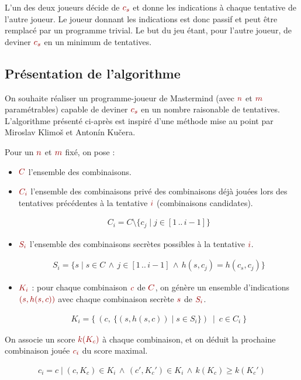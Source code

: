 \documentclass[a4paper]{article}
\newcommand{\isep}{\,..\,}
\renewcommand{\(}{\begin{math}\color{brick}}
\renewcommand{\)}{\end{math}}
\newcommand{\blockmath}[1]{{\color{brick}\begin{align*}#1\end{align*}}}
\newcommand{\nblockmath}[1]{{\color{brick}\begin{align}#1\end{align}}}
\newcommand{\lnd}{\,\land\,}
\begin{document}
L'un des deux joueurs décide de \(c_s\) et donne les indications à
chaque tentative de l'autre joueur. Le joueur donnant les indications est
donc passif et peut être remplacé par un programme trivial. Le but du
jeu étant, pour l'autre joueur, de deviner \(c_s\) en un minimum de
tentatives.

\subsection{Présentation de l'algorithme}

On souhaite réaliser un programme-joueur de Mastermind (avec \(n\) et \(m\) paramétrables) capable de deviner \(c_s\) en un nombre raisonable de tentatives. L'algorithme présenté ci-après est inspiré d'une méthode\cite{sat} mise au point par Miroslav Klimoš et Antonín Kučera.

Pour un \(n\) et \(m\) fixé, on pose :

\begin{itemize}
  
\item \(C\) l'ensemble des combinaisons.
  
\item \(C_i\) l'ensemble des combinaisons privé des combinaisons déjà jouées lors des tentatives précédentes à la tentative \(i\) (combinaisons candidates).
  
  \blockmath{
    C_i = C \setminus \{c_j \mid j \in [1 \isep i-1]\}
  }

\item \(S_i\) l'ensemble des combinaisons secrètes possibles à la tentative \(i\).
  
  \nblockmath{ \label{pred}
    S_i = \{s \mid s \in C \lnd j \in [1 \isep i-1] \lnd h(s,c_j) = h(c_s,c_j)\}
  }

\item \(K_i\) : pour chaque combinaison \(c\) de \(C\), on génère un ensemble d'indications \((s,h(s,c))\) avec chaque combinaison secrète \(s\) de \(S_i\).
  
  \nblockmath{ \label{prod}
    K_i = \{ \ (c, \ \{(s,h(s,c)) \mid s \in S_i\}) \ \mid \ c \in C_i \ \}
  }

\end{itemize}

On associe un score \(k(K_c)\) à chaque combinaison, et on déduit la prochaine combinaison jouée \(c_i\) du score maximal.

\blockmath{
  c_i = c \mid (c,K_c) \in K_i \lnd (c',K_c') \in K_i \lnd k(K_c) \geq k(K_c')
}
\end{document}
